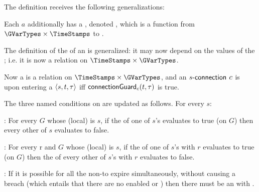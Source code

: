 \documentclass[12pt]{article}
\begin{document}

 The \Event definition receives the following generalizations:
\begin{LPPI}
\item Each \Action $a$ additionally has a \gvTransform, denoted , which is a function from
$\GVarTypes \times \TimeStamps$ to \GVarTypes.
\item The definition of the \TGuard of an  is generalized: it may now depend on the values of the \GVars; i.e. it is now a relation on $\TimeStamps \times \GVarTypes$.
\end{LPPI}

Now a \TGuard is a relation on $\TimeStamps \times \GVarTypes$, and an $s\textsf{-connection}$ $c$ is  upon entering a \GlobalState $\langle s,t,\tau\rangle$ iff $\textsf{connectionGuard}_{c}(t,\tau)$ is true.


The three named conditions on \TGuards are updated as follows. For every \State $s$:
\medskip

\noindent {}: For every \GlobalState $G$ whose (local) \State is $s$, if the \TGuard of one of $s$'s \mustntrans evaluates to true (on $G$) then every other \TGuard of $s$ evaluates to false. 
\medskip

\noindent {}: For every \Role r and \GlobalState $G$ whose (local) \State is $s$, if the \TGuard of one of $s$'s \rmustntrans with \Role $r$ evaluates to true (on $G$) then the \TGuard of every other of $s$'s \rmustntrans with \Role $r$ evaluates to false.
\medskip

\noindent {}: If it is possible for all the \enabled non-\Env \connections to expire simultaneously, without causing a breach (which entails that there are no enabled \mustntrans or \rmustntrans) then there must be an \depTrans{\Env} with \Deadline \nodeadline.


\end{document}
